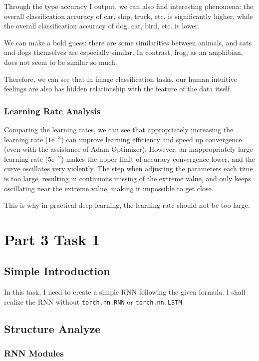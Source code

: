 \documentclass{article}
\begin{document}
Through the type accuracy I output, we can also find interesting phenomena: the overall classification accuracy of car, ship, truck, etc. is significantly higher, while the overall classification accuracy of dog, cat, bird, etc. is lower.

We can make a bold guess: there are some similarities between animals, and cats and dogs themselves are especially similar. In contrast, frog, as an amphibian, does not seem to be similar so much.

Therefore, we can see that in image classification tasks, our human intuitive feelings are also has hidden relationship with the feature of the data itself.

\subsubsection{Learning Rate Analysis}

Comparing the learning rates, we can see that appropriately increasing the learning rate ($1\mathrm{e}^{-3}$) can improve learning efficiency and speed up convergence (even with the assistance of Adam Optimizer). However, an inappropriately large learning rate ($5\mathrm{e}^{-2}$) makes the upper limit of accuracy convergence lower, and the curve oscillates very violently. The step when adjusting the parameters each time is too large, resulting in continuous missing of the extreme value, and only keeps oscillating near the extreme value, making it impossible to get close.

This is why in practical deep learning, the learning rate should not be too large.

\section{Part 3 Task 1}

\subsection{Simple Introduction}

In this task, I need to create a simple RNN following the given formula. I shall realize the RNN without \texttt{torch.nn.RNN} or \texttt{torch.nn.LSTM}

\subsection{Structure Analyze}

\subsubsection{RNN Modules}
\end{document}

